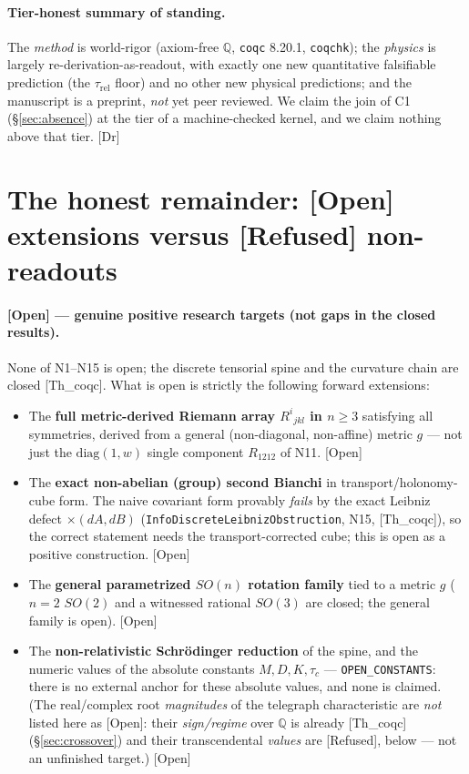 \documentclass[10pt,twocolumn]{article}
\theoremstyle{definition}
\newcommand{\Thq}{\textsf{[Th\_coqc]}}
\newcommand{\Dr}{\textsf{[Dr]}}
\newcommand{\Open}{\textsf{[Open]}}
\newcommand{\Refu}{\textsf{[Refused]}}
\newcommand{\code}[1]{\texttt{#1}}
\begin{document}
\paragraph{Tier-honest summary of standing.} The \emph{method} is world-rigor
(axiom-free $\mathbb{Q}$, \code{coqc} 8.20.1, \code{coqchk}); the \emph{physics} is largely
re-derivation-as-readout, with exactly one new quantitative falsifiable prediction (the
$\tau_{\mathrm{rel}}$ floor) and no other new physical predictions; and the manuscript is a preprint,
\emph{not} yet peer reviewed. We claim the join of C1 (\S\ref{sec:absence}) at the tier of a
machine-checked kernel, and we claim nothing above that tier. \Dr{}

\section{The honest remainder: \Open{} extensions versus \Refu{} non-readouts}
\label{sec:remainder}

\paragraph{\Open{} --- genuine positive research targets (not gaps in the closed results).}
None of N1--N15 is open; the discrete tensorial spine and the curvature chain are closed
\Thq{}. What is open is strictly the following forward extensions:
\begin{itemize}\itemsep2pt
\item The \textbf{full metric-derived Riemann array $R^{i}{}_{jkl}$ in $n\ge 3$} satisfying
  all symmetries, derived from a general (non-diagonal, non-affine) metric $g$ --- not just
  the $\mathrm{diag}(1,w)$ single component $R_{1212}$ of N11. \Open{}
\item The \textbf{exact non-abelian (group) second Bianchi} in transport/holonomy-cube form.
  The naive covariant form provably \emph{fails} by the exact Leibniz defect $\times(dA,dB)$
  (\code{InfoDiscreteLeibnizObstruction}, N15, \Thq{}), so the correct statement needs the
  transport-corrected cube; this is open as a positive construction. \Open{}
\item The \textbf{general parametrized $SO(n)$ rotation family} tied to a metric $g$ ($n=2$
  $SO(2)$ and a witnessed rational $SO(3)$ are closed; the general family is open). \Open{}
\item The \textbf{non-relativistic Schr\"odinger reduction} of the spine, and the numeric
  values of the absolute constants $M,D,K,\tau_c$ --- \code{OPEN\_CONSTANTS}: there is no
  external anchor for these absolute values, and none is claimed. (The real/complex root
  \emph{magnitudes} of the telegraph characteristic are \emph{not} listed here as \Open{}:
  their \emph{sign/regime} over $\mathbb{Q}$ is already \Thq{} (\S\ref{sec:crossover}) and
  their transcendental \emph{values} are \Refu{}, below --- not an unfinished target.) \Open{}
\end{itemize}
\end{document}
